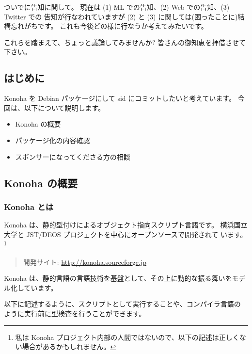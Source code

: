\documentclass[mingoth,a4paper]{jsarticle}
\begin{document}
ついでに告知に関して。
現在は (1) ML での告知、(2) Web での告知、(3) Twitter \@debianjp での
告知が行なわれていますが (2) と (3) に関しては(困ったことに)結構忘れがちです。
これも今後どの様に行なうか考えてみたいです。

これらを踏まえて、ちょっと議論してみませんか?
皆さんの御知恵を拝借させて下さい。

\clearpage

\subsection{はじめに}
Konoha を Debian パッケージにして sid にコミットしたいと考えています。
今回は、以下について説明します。
\begin{itemize}
\item Konoha の概要
\item パッケージ化の内容確認
\item スポンサーになってくださる方の相談
\end{itemize}

\subsection{Konoha の概要}

\subsubsection{Konoha とは}
Konoha は、静的型付けによるオブジェクト指向スクリプト言語です。
横浜国立大学と JST/DEOS プロジェクトを中心にオープンソースで開発されて
います。
\footnote{私は Konoha プロジェクト内部の人間ではないので、以下の記述は正しくない場合があるかもしれません。}

\begin{quote}
開発サイト: \url{http://konoha.sourceforge.jp}
\end{quote}

Konoha は、静的言語の言語技術を基盤として、その上に動的な振る舞いをモデ
ル化しています。

以下に記述するように、スクリプトとして実行することや、コンパイラ言語の
ように実行前に型検査を行うことができます。
\end{document}
